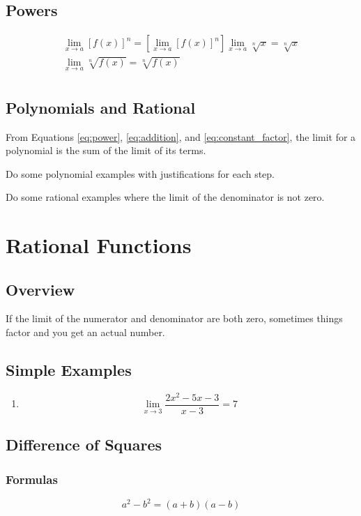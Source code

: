 \documentclass[letterpaper, landscape]{exam}
\begin{document}
  \subsection{Powers}
  \begin{align}
    \lim_{x \to a} \left[ f(x) \right]^n = \left[ \lim_{x \to a} [f(x)]^n \right] \label{eq:power}
    \lim_{x \to a} \sqrt[n]{x} = \sqrt[n]{x} \\
    \lim_{x \to a} \sqrt[n]{ f(x) } = \sqrt[n]{ f(x) } \\
  \end{align}

  \subsection{Polynomials and Rational}
  From Equations \ref{eq:power}, \ref{eq:addition}, and
  \ref{eq:constant_factor}, the limit for a polynomial is the sum of the limit
  of its terms.

  Do some polynomial examples with justifications for each step.

  Do some rational examples where the limit of the denominator is not zero.

  \section{Rational Functions}

  \subsection{Overview}
  If the limit of the numerator and denominator are both zero, sometimes things
  factor and you get an actual number.

  \subsection{Simple Examples}

  \begin{enumerate}
    \item 
      \[
        \lim_{x \to 3} \frac{2x^2 - 5x - 3}{x - 3} = 7 
      \]
  \end{enumerate}

  \subsection{Difference of Squares}

  \subsubsection{Formulas}
  \[
    a^2 - b^2 = (a + b)(a - b)
  \]
\end{document}
